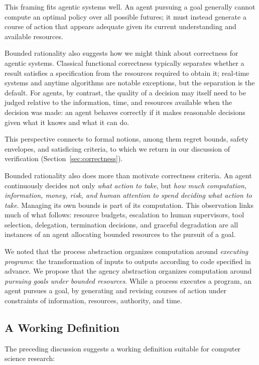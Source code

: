 \documentclass[11pt]{article}
\begin{document}
This framing fits agentic systems well. An agent pursuing a goal generally cannot compute an optimal policy over all possible futures; it must instead generate a course of action that appears adequate given its current understanding and available resources.

Bounded rationality also suggests how we might think about correctness for agentic systems. Classical functional correctness typically separates whether a result satisfies a specification from the resources required to obtain it; real-time systems and anytime algorithms are notable exceptions, but the separation is the default. For agents, by contrast, the quality of a decision may itself need to be judged relative to the information, time, and resources available when the decision was made: an agent behaves correctly if it makes reasonable decisions given what it knows and what it can do.

This perspective connects to formal notions, among them regret bounds, safety envelopes, and satisficing criteria, to which we return in our discussion of verification (Section~\ref{sec:correctness}).

Bounded rationality also does more than motivate correctness criteria. An agent continuously decides not only \textit{what action to take}, but \textit{how much computation, information, money, risk, and human attention to spend deciding what action to take}. Managing its own bounds is part of its computation. This observation links much of what follows: resource budgets, escalation to human supervisors, tool selection, delegation, termination decisions, and graceful degradation are all instances of an agent allocating bounded resources to the pursuit of a goal.

We noted that the process abstraction organizes computation around \textit{executing programs}: the transformation of inputs to outputs according to code specified in advance. We propose that the agency abstraction organizes computation around \textit{pursuing goals under bounded resources}. While a process executes a program, an agent pursues a goal, by generating and revising courses of action under constraints of information, resources, authority, and time.

\subsection{A Working Definition}
\label{sec:definition}

The preceding discussion suggests a working definition suitable for computer science research:
\end{document}
